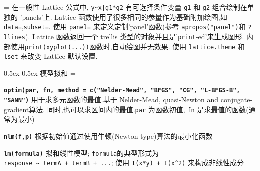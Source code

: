 \documentclass[landscape]{article}
\makeatletter
\renewcommand\section{\@startsection{section}{1}{0mm}%
                                     {0.5ex}%
                                     {0.5ex}%
                                {\color{black}\normalfont\large\bfseries}}
\newcommand{\code}{\texttt}
\newcommand{\bcode}[1]{\texttt{\textbf{#1}}}
\makeatother
\begin{document}
\begin{multicols*}{3}
\everypar={\hangindent=0mm}
在一般性 Lattice 公式中, \code{y\~{}x|g1*g2} 有可选择条件变量 \code{g1} 和 \code{g2} 组合绘制在单独的 'panels'上.
Lattice 函数使用了很多相同的参量作为基础附加绘图,如 \code{data=},\code{subset=}.
使用 \code{panel=} 来定义定制'panel'函数(参考 \code{apropos("panel")}和 \code{?llines}).
Lattice 函数返回一个 trellis 类型的对象并且是'\code{print}-ed'来生成图形.
内部使用\code{print(xyplot(...))}函数时,自动绘图并无效果.
使用 \code{lattice.theme} 和 \code{lset} 来改变 Lattice 默认设置.


\section{模型拟和}
\everypar={\hangindent=9mm}

\bcode{optim(par, fn, method = c("Nelder-Mead", "BFGS", "CG",
  "L-BFGS-B", "SANN")}  用于求多元函数的最值.基于 Nelder-Mead, quasi-Newton and conjugate-gradient算法.
  同时,也可以求区间内的最值.\code{par} 为函数初值,
  \code{fn} 是求最值的函数(通常为最小)

\bcode{nlm(f,p)} 根据初始值通过使用牛顿(Newton-type)算法的最小化函数

\bcode{lm(formula)} 拟和线性模型; \code{formula}的典型形式为 \\
 \code{response \~{} termA + termB + ...};
使用 \code{I(x*y) + I(x\^{}2)} 来构成非线性成分


\end{multicols*}
\end{document}
